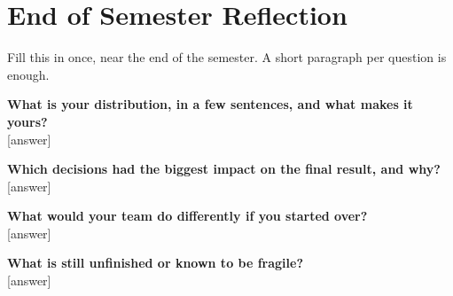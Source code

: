 \documentclass[11pt]{article}
\begin{document}
\section{End of Semester Reflection}

Fill this in once, near the end of the semester. A short paragraph per question is enough.

\begin{fillBox}[Reflection]
\textbf{What is your distribution, in a few sentences, and what makes it yours?} \\
{[answer]}

\vspace{4pt}
\textbf{Which decisions had the biggest impact on the final result, and why?} \\
{[answer]}

\vspace{4pt}
\textbf{What would your team do differently if you started over?} \\
{[answer]}

\vspace{4pt}
\textbf{What is still unfinished or known to be fragile?} \\
{[answer]}
\end{fillBox}
\end{document}
